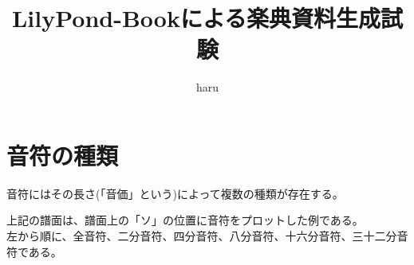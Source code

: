 \documentclass{ltjsarticle}
\begin{document}
\title{LilyPond-Bookによる楽典資料生成試験}
\author{haru}
\maketitle

\tableofcontents
\clearpage

\section{音符の種類}

音符にはその長さ(「音価」という)によって複数の種類が存在する。\\

{%
\parindent 0pt
\noindent
\ifx\preLilyPondExample \undefined
\else
  \expandafter\preLilyPondExample
\fi
\def\lilypondbook{}%
%
\ifx\postLilyPondExample \undefined
\else
  \expandafter\postLilyPondExample
\fi
}

上記の譜面は、譜面上の「ソ」の位置に音符をプロットした例である。 \\
左から順に、全音符、二分音符、四分音符、八分音符、十六分音符、三十二分音符である。
\end{document}
